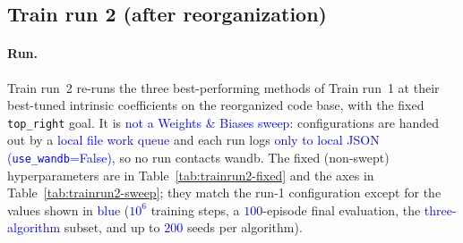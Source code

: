 
\subsection{Train run 2 (after reorganization)}
\label{sec:train-run-2}

\paragraph{Run.}
Train run~2 re-runs the three best-performing methods of Train run~1 at their best-tuned intrinsic
coefficients on the reorganized code base, with the fixed \texttt{top\_right} goal. It is
\textcolor{blue}{not a Weights \& Biases sweep}: configurations are handed out by a
\textcolor{blue}{local file work queue} and each run logs \textcolor{blue}{only to local JSON
(\texttt{use\_wandb}=False)}, so no run contacts wandb. The fixed (non-swept) hyperparameters are in
Table~\ref{tab:trainrun2-fixed} and the axes in Table~\ref{tab:trainrun2-sweep}; they match the run-1
configuration except for the values shown in \textcolor{blue}{blue}
(\textcolor{blue}{$10^{6}$} training steps, a \textcolor{blue}{$100$}-episode final evaluation, the
\textcolor{blue}{three-algorithm} subset, and up to \textcolor{blue}{$200$} seeds per algorithm).

